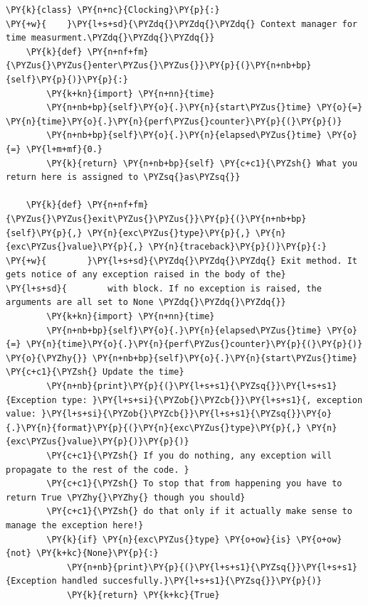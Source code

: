 \begin{Verbatim}[label=\makebox{\url{https://github.com/lucabaldini/cmepda/tree/master/slides/latex/snippets/context\_manager.py}},commandchars=\\\{\}]
\PY{k}{class} \PY{n+nc}{Clocking}\PY{p}{:}
\PY{+w}{    }\PY{l+s+sd}{\PYZdq{}\PYZdq{}\PYZdq{} Context manager for time measurment.\PYZdq{}\PYZdq{}\PYZdq{}}
    \PY{k}{def} \PY{n+nf+fm}{\PYZus{}\PYZus{}enter\PYZus{}\PYZus{}}\PY{p}{(}\PY{n+nb+bp}{self}\PY{p}{)}\PY{p}{:}
        \PY{k+kn}{import} \PY{n+nn}{time}
        \PY{n+nb+bp}{self}\PY{o}{.}\PY{n}{start\PYZus{}time} \PY{o}{=} \PY{n}{time}\PY{o}{.}\PY{n}{perf\PYZus{}counter}\PY{p}{(}\PY{p}{)}
        \PY{n+nb+bp}{self}\PY{o}{.}\PY{n}{elapsed\PYZus{}time} \PY{o}{=} \PY{l+m+mf}{0.}
        \PY{k}{return} \PY{n+nb+bp}{self} \PY{c+c1}{\PYZsh{} What you return here is assigned to \PYZsq{}as\PYZsq{}}
    
    \PY{k}{def} \PY{n+nf+fm}{\PYZus{}\PYZus{}exit\PYZus{}\PYZus{}}\PY{p}{(}\PY{n+nb+bp}{self}\PY{p}{,} \PY{n}{exc\PYZus{}type}\PY{p}{,} \PY{n}{exc\PYZus{}value}\PY{p}{,} \PY{n}{traceback}\PY{p}{)}\PY{p}{:}
\PY{+w}{        }\PY{l+s+sd}{\PYZdq{}\PYZdq{}\PYZdq{} Exit method. It gets notice of any exception raised in the body of the}
\PY{l+s+sd}{        with block. If no exception is raised, the arguments are all set to None \PYZdq{}\PYZdq{}\PYZdq{}}
        \PY{k+kn}{import} \PY{n+nn}{time}
        \PY{n+nb+bp}{self}\PY{o}{.}\PY{n}{elapsed\PYZus{}time} \PY{o}{=} \PY{n}{time}\PY{o}{.}\PY{n}{perf\PYZus{}counter}\PY{p}{(}\PY{p}{)} \PY{o}{\PYZhy{}} \PY{n+nb+bp}{self}\PY{o}{.}\PY{n}{start\PYZus{}time} \PY{c+c1}{\PYZsh{} Update the time}
        \PY{n+nb}{print}\PY{p}{(}\PY{l+s+s1}{\PYZsq{}}\PY{l+s+s1}{Exception type: }\PY{l+s+si}{\PYZob{}\PYZcb{}}\PY{l+s+s1}{, exception value: }\PY{l+s+si}{\PYZob{}\PYZcb{}}\PY{l+s+s1}{\PYZsq{}}\PY{o}{.}\PY{n}{format}\PY{p}{(}\PY{n}{exc\PYZus{}type}\PY{p}{,} \PY{n}{exc\PYZus{}value}\PY{p}{)}\PY{p}{)}
        \PY{c+c1}{\PYZsh{} If you do nothing, any exception will propagate to the rest of the code. }
        \PY{c+c1}{\PYZsh{} To stop that from happening you have to return True \PYZhy{}\PYZhy{} though you should}
        \PY{c+c1}{\PYZsh{} do that only if it actually make sense to manage the exception here!}
        \PY{k}{if} \PY{n}{exc\PYZus{}type} \PY{o+ow}{is} \PY{o+ow}{not} \PY{k+kc}{None}\PY{p}{:}
            \PY{n+nb}{print}\PY{p}{(}\PY{l+s+s1}{\PYZsq{}}\PY{l+s+s1}{Exception handled succesfully.}\PY{l+s+s1}{\PYZsq{}}\PY{p}{)}
            \PY{k}{return} \PY{k+kc}{True}
        

\end{Verbatim}
